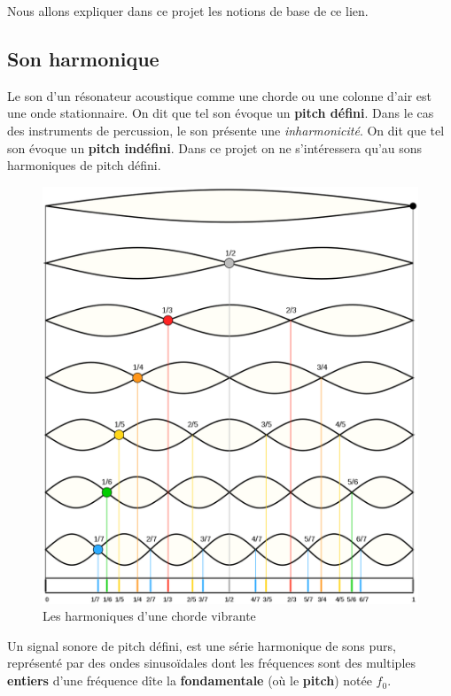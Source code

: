 \documentclass[]{article}
\begin{document}
Nous allons expliquer dans ce projet les notions de base de ce lien.

\hypertarget{son-harmonique}{%
\subsection{Son harmonique}\label{son-harmonique}}

Le son d'un résonateur acoustique comme une chorde ou une colonne d'air
est une onde stationnaire. On dit que tel son évoque un \textbf{pitch
défini}. Dans le cas des instruments de percussion, le son présente une
\emph{inharmonicité}. On dit que tel son évoque un \textbf{pitch
indéfini}. Dans ce projet on ne s'intéressera qu'au sons harmoniques de
pitch défini.

\begin{figure}
\centering
\includegraphics[width=\textwidth,height=0.35\textheight]{img/harmonic-string.png}
\caption{Les harmoniques d'une chorde vibrante}
\end{figure}

Un signal sonore de pitch défini, est une série harmonique de sons purs,
représenté par des ondes sinusoïdales dont les fréquences sont des
multiples \textbf{entiers} d'une fréquence dîte la \textbf{fondamentale}
(où le \textbf{pitch}) notée \(f_0\).
\end{document}
